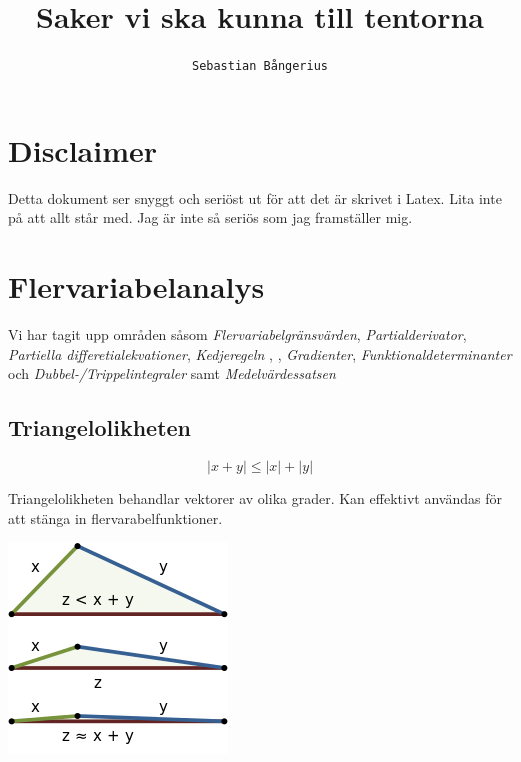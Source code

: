 \documentclass[10pt,a4paper]{article}
\author{
  \texttt{Sebastian Bångerius}
}
\begin{document}

\title{Saker vi ska kunna till tentorna}
\maketitle

\cleardoublepage

\tableofcontents

\clearpage
\section{Disclaimer}
Detta dokument ser snyggt och seriöst ut för att det är skrivet i Latex. Lita inte på att allt står med. Jag är inte så seriös som jag framställer mig.

\section{Flervariabelanalys}
Vi har tagit upp områden såsom \textit{Flervariabelgränsvärden}, \textit{Partialderivator}, \textit{Partiella differetialekvationer}, \textit{Kedjeregeln} , \textit{}, \textit{Gradienter}, \textit{Funktionaldeterminanter} och \textit{Dubbel-/Trippelintegraler} samt \textit{Medelvärdessatsen}

\subsection{Triangelolikheten}
\begin{equation}
\left|x+y\right|\leq\left|x\right|+\left|y\right|
\end{equation}
\begin{flushleft}
Triangelolikheten behandlar vektorer av olika grader. Kan effektivt användas för att stänga in flervarabelfunktioner.
\end{flushleft}
\begin{center}
\includegraphics[scale=0.5]{triangelolikhet}
\end{center}
\end{document}
